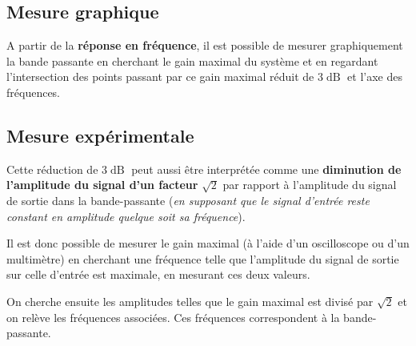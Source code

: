 \subsection{Mesure graphique}

A partir de la \textbf{réponse en fréquence}, il est possible de mesurer graphiquement la bande passante en cherchant le gain maximal du système et en regardant l'intersection des points passant par ce gain maximal réduit de $3\operatorname{dB}$ et l'axe des fréquences.


\subsection{Mesure expérimentale}

Cette réduction de $3\operatorname{dB}$ peut aussi être interprétée comme une \textbf{diminution de l'amplitude du signal d'un facteur} $\sqrt{2}$ par rapport à l'amplitude du signal de sortie dans la bande-passante (\textit{en supposant que le signal d'entrée reste constant en amplitude quelque soit sa fréquence}).

Il est donc possible de mesurer le gain maximal (à l'aide d'un oscilloscope ou d'un multimètre) en cherchant une fréquence telle que l'amplitude du signal de sortie sur celle d'entrée est maximale, en mesurant ces deux valeurs.

On cherche ensuite les amplitudes telles que le gain maximal est divisé par $\sqrt{2}$ et on relève les fréquences associées. Ces fréquences correspondent à la bande-passante.